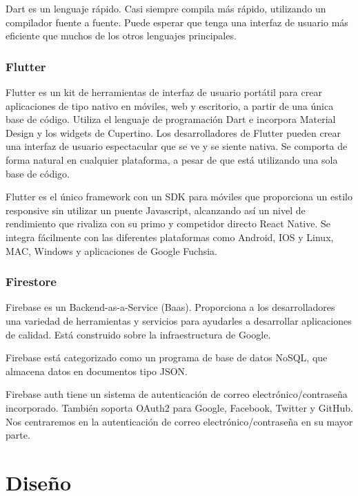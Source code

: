 \documentclass{article}
\begin{document}
Dart es un lenguaje rápido. Casi siempre compila más rápido, utilizando 
un compilador fuente a fuente. Puede esperar que tenga una interfaz de 
usuario más eficiente que muchos de los otros lenguajes principales.


\subsubsection{Flutter}
Flutter es un kit de herramientas de interfaz de usuario portátil para crear 
aplicaciones de tipo nativo en móviles, web y escritorio, a partir de una 
única base de código. Utiliza el lenguaje de programación Dart e incorpora 
Material Design y los widgets de Cupertino. Los desarrolladores de Flutter 
pueden crear una interfaz de usuario espectacular que se ve y se siente 
nativa. Se comporta de forma natural en cualquier plataforma, a pesar de 
que está utilizando una sola base de código.

Flutter es el único framework con un SDK para móviles que proporciona un 
estilo responsive sin utilizar un puente Javascript, alcanzando así un 
nivel de rendimiento que rivaliza con su primo y competidor directo 
React Native. Se integra fácilmente con las diferentes plataformas como 
Android, IOS y Linux, MAC, Windows y aplicaciones de Google Fuchsia.


\subsubsection{Firestore}
Firebase es un Backend-as-a-Service (Baas). Proporciona a los desarrolladores 
una variedad de herramientas y servicios para ayudarles a desarrollar aplicaciones 
de calidad. Está construido sobre la infraestructura de Google.

Firebase está categorizado como un programa de base de datos NoSQL, que almacena 
datos en documentos tipo JSON.

Firebase auth tiene un sistema de autenticación de correo electrónico/contraseña 
incorporado. También soporta OAuth2 para Google, Facebook, Twitter y GitHub. 
Nos centraremos en la autenticación de correo electrónico/contraseña en su mayor 
parte. 



\pagebreak
\section{Diseño}
\end{document}
